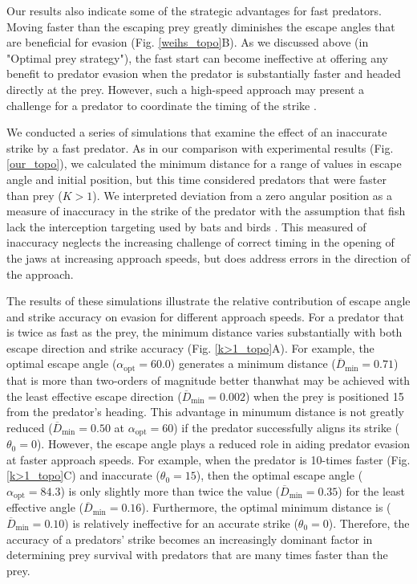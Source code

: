 \documentclass[12pt]{article}
\newcommand{\ol}{\overline}
\begin{document}
Our results also indicate some of the strategic advantages for fast predators.
Moving faster than the escaping prey greatly diminishes the escape angles that
are beneficial for evasion (Fig. \ref{weihs_topo}B). As we discussed above (in
"Optimal prey strategy"), the fast start can become ineffective at offering any
benefit to predator evasion when the predator is substantially faster and
headed directly at the prey. However, such a high-speed approach may present a
challenge for a predator to coordinate the timing of the strike
\citep{Higham:2007go, Higham:2005iu}. 

We conducted a series of simulations that examine the effect of an inaccurate
strike by a fast predator. As in our comparison with experimental results (Fig.
\ref{our_topo}), we calculated the minimum distance for a range of values in
escape angle and initial position, but this time considered predators that were
faster than prey ($K>1$). We interpreted deviation from a zero angular position
as a measure of inaccuracy in the strike of the predator with the assumption
that fish lack the interception targeting used by bats \citep{Ghose:2006dk} and
birds \citep{Kane:2014fs}. This measured of inaccuracy neglects the increasing
challenge of correct timing in the opening of the jaws at increasing approach
speeds, but does address errors in the direction of the approach.

The results of these simulations illustrate the relative contribution of escape
angle and strike accuracy on evasion for different approach speeds. For a
predator that is twice as fast as the prey, the minimum distance varies
substantially with both escape direction and strike accuracy (Fig.
\ref{k>1_topo}A). For example, the optimal escape angle
($\alpha_{\text{opt}}=60.0$\textdegree) 
generates a minimum distance 
($\ol D_{\text{min}}=0.71$) 
that is more than two-orders of magnitude better
thanwhat may be achieved with the least effective escape direction 
($\ol D_{\text{min}}=0.002$) 
when the prey is positioned 
15\textdegree\hspace{0.5pt}
from the predator's heading. This advantage in minumum distance is not greatly
reduced ($\ol D_{\text{min}}=0.50$ at $\alpha_{\text{opt}}=60$\textdegree) if
the predator successfully aligns its strike ($\theta_0=0$\textdegree). However,
the escape angle plays a reduced role in aiding predator evasion at faster
approach speeds. For example, when the predator is 10-times faster  (Fig.
\ref{k>1_topo}C) and inaccurate ($\theta_0=15$\textdegree), then the optimal
escape angle ($\alpha_{\text{opt}}=84.3$\textdegree) is only slightly more than
twice the value ($\ol D_{\text{min}}=0.35$) for the least effective angle ($\ol
D_{\text{min}}=0.16$). Furthermore, the optimal minimum distance is ($\ol
D_{\text{min}}=0.10$) is relatively ineffective for an accurate strike
($\theta_0=0$\textdegree). Therefore, the accuracy of a predators' strike
becomes an increasingly dominant factor in determining prey survival with
predators that are many times faster than the prey.
\end{document}
